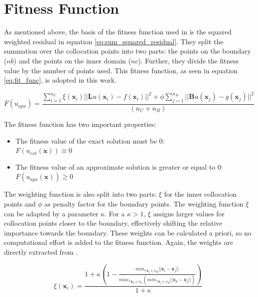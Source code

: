 \documentclass[./\jobname.tex]{subfiles}
\begin{document}
\section{Fitness Function}
\label{chap:fit_func}

As mentioned above, the basis of the fitness function used in \cite{chaquet_using_2019} is the squared weighted residual in equation \ref{eq:sum_squared_residual}. They split the summation over the collocation points into two parts: the points on the boundary ($nb$) and the points on the inner domain ($nc$). Further, they divide the fitness value by the number of points used. This fitness function, as seen in equation \ref{eq:fit_func}, is adopted in this work. 

\begin{equation}
\label{eq:fit_func}
F(u_{apx}) = \frac{\sum_{i=1}^{n_C} \xi (\mathbf{x}_i) || \mathbf{L}u(\mathbf{x}_i) - f(\mathbf{x}_i)||^2 + \phi \sum_{j=1}^{n_B} || \mathbf{B}u(\mathbf{x}_j) - g(\mathbf{x}_j)||^2}{(n_C + n_B)}  
\end{equation}

The fitness function has two important properties: 
\begin{itemize}
	\item The fitness value of the exact solution must be 0:\\
	$F(u_{ext}(\mathbf{x})) \equiv 0$ 
	\item The fitness value of an approximate solution is greater or equal to 0: \\
	$F(u_{apx}(\mathbf{x})) \geq 0$
\end{itemize}
 

The weighting function is also split into two parts: $\xi$ for the inner collocation points and $\phi$ as penalty factor for the boundary points. The weighting function $\xi$ can be adapted by a parameter $\kappa$. For a $\kappa > 1$, $\xi$ assigns larger values for collocation points closer to the boundary, effectively shifting the relative importance towards the boundary. These weights can be calculated a priori, so no computational effort is added to the fitness function. Again, the weights are directly extracted from \cite{chaquet_using_2019}. 

\begin{equation}
\label{eq:nc_weight}
\xi(\mathbf{x}_i) = \frac{1 + \kappa \left(1 - \frac{min_{\forall \mathbf{x}_j\in n_B}|| \mathbf{x}_i - \mathbf{x}_j ||}{max_{\forall\mathbf{x}_k \in n_C}(min_{\forall \mathbf{x}_j \in n_B} || \mathbf{x}_k - \mathbf{x}_j ||)}\right)}{1 + \kappa}
\end{equation}
\end{document}
